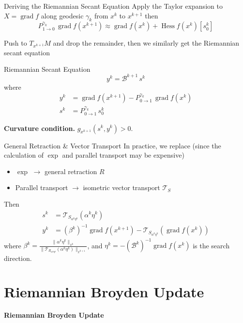 \documentclass[10pt,aspectratio=169]{beamer}
\DeclareMathOperator{\grad}{grad}
\DeclareMathOperator{\hess}{Hess}
\newcommand{\VT}{\mathcal{T}}
\begin{document}
\begin{frame}{Deriving the Riemannian Secant Equation}
Apply the Taylor expansion to $X = \grad f$ along geodesic $\gamma_k$ from $x^k$ to $x^{k+1}$ then
$$P_{1\to 0}^{\gamma_k}\,\grad f(x^{k+1}) \approx \grad f(x^k) + \hess f(x^k)[s^k_0]$$

Push to $T_{x^{k+1}}M$ and drop the remainder, then we similarly get the Riemannian secant equation
\begin{block}{Riemannian Secant Equation}
$$y^k = \mathcal{B}^{k+1}\,s^k$$
where
\begin{align*}
    y^k &= \grad f(x^{k+1}) - P_{0\to 1}^{\gamma_k}\,\grad f(x^k)\\
    s^k &= P_{0\to 1}^{\gamma_k}\,s^k_0
\end{align*}
\end{block}
\textbf{Curvature condition.} $g_{x^{k+1}}(s^k, y^k) > 0$.
\end{frame}

\begin{frame}{General Retraction \& Vector Transport}
In practice, we replace (since the calculation of $\exp$ and parallel transport may be expensive)
\begin{itemize}
    \item $\exp$ $\longrightarrow$ general retraction $R$
    \item Parallel transport $\longrightarrow$ isometric vector transport $\VT_S$
\end{itemize}

\medskip
Then
\begin{align*}
    s^k &= \VT_{S_{\alpha^k\eta^k}}(\alpha^k\eta^k)\\
    y^k &= (\beta^k)^{-1}\grad f(x^{k+1}) - \VT_{S_{\alpha^k\eta^k}}(\grad f(x^k))
\end{align*}
where $\beta^k = \frac{\|\alpha^k\eta^k\|_{x^k}}{\|\VT_{R_{\alpha^k\eta^k}}(\alpha^k\eta^k)\|_{x^{k+1}}}$, and $\eta^k = -(\mathcal{B}^k)^{-1}\grad f(x^k)$ is the search direction.

\end{frame}
\section{Riemannian Broyden Update}

\begin{frame}{}
\centering
\vfill
{\Huge\bfseries Riemannian Broyden Update}
\vfill
\end{frame}
\end{document}
